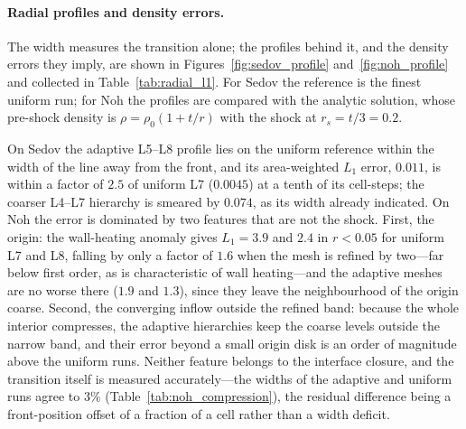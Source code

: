 \documentclass[a4paper]{cas-sc}
\begin{document}
\paragraph{Radial profiles and density errors.}
The width measures the transition alone; the profiles behind it, and the
density errors they imply, are shown in Figures~\ref{fig:sedov_profile}
and~\ref{fig:noh_profile} and collected in Table~\ref{tab:radial_l1}. For Sedov
the reference is the finest uniform run; for Noh the profiles are compared with
the analytic solution, whose pre-shock density is $\rho=\rho_0(1+t/r)$ with the
shock at $r_s=t/3=0.2$.

On Sedov the adaptive L5--L8 profile lies on the uniform reference within the
width of the line away from the front, and its area-weighted $L_1$ error,
$0.011$, is within a factor of $2.5$ of uniform L7 ($0.0045$) at a tenth of its
cell-steps; the coarser L4--L7 hierarchy is smeared by $0.074$, as its width
already indicated. On Noh the error is dominated by two features that are not
the shock. First, the origin: the wall-heating anomaly gives $L_1=3.9$ and
$2.4$ in $r<0.05$ for uniform L7 and L8, falling by only a factor of $1.6$ when
the mesh is refined by two---far below first order, as is characteristic of
wall heating---and the adaptive meshes are no worse there ($1.9$ and $1.3$),
since they leave the neighbourhood of the origin coarse. Second, the converging
inflow outside the refined band: because the whole interior compresses, the
adaptive hierarchies keep the coarse levels outside the narrow band, and their
error beyond a small origin disk is an order of magnitude above the uniform
runs. Neither feature belongs to the interface closure, and the transition
itself is measured accurately---the widths of the adaptive and uniform runs
agree to $3\%$ (Table~\ref{tab:noh_compression}), the residual difference being
a front-position offset of a fraction of a cell rather than a width deficit.
\end{document}
